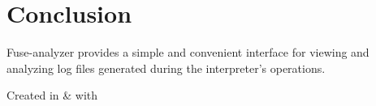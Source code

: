 \documentclass[a4paper,12pt]{article}
\begin{document}
\section{Conclusion}
Fuse-analyzer provides a simple and convenient interface for viewing and analyzing log files generated during the interpreter's operations.




\vspace*{\fill}
\begin{center}Created in  \& 
	with \end{center}
\end{document}
